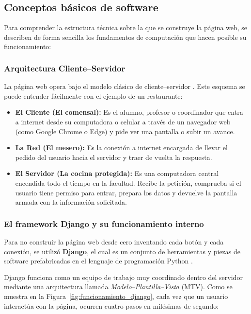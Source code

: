 \subsection{Conceptos básicos de software}
\label{subsec:conceptos_software}

Para comprender la estructura técnica sobre la que se construye la página web, se describen de forma sencilla los fundamentos de computación que hacen posible su funcionamiento:

\subsubsection{Arquitectura Cliente--Servidor}
La página web opera bajo el modelo clásico de cliente--servidor \parencite{tanenbaum2011redes}. Este esquema se puede entender fácilmente con el ejemplo de un restaurante:
\begin{itemize}
    \item \textbf{El Cliente (El comensal):} Es el alumno, profesor o coordinador que entra a internet desde su computadora o celular a través de un navegador web (como Google Chrome o Edge) y pide ver una pantalla o subir un avance.
    \item \textbf{La Red (El mesero):} Es la conexión a internet encargada de llevar el pedido del usuario hacia el servidor y traer de vuelta la respuesta.
    \item \textbf{El Servidor (La cocina protegida):} Es una computadora central encendida todo el tiempo en la facultad. Recibe la petición, comprueba si el usuario tiene permiso para entrar, prepara los datos y devuelve la pantalla armada con la información solicitada.
\end{itemize}

\subsubsection{El framework Django y su funcionamiento interno}
Para no construir la página web desde cero inventando cada botón y cada conexión, se utilizó \textbf{Django}, el cual es un conjunto de herramientas y piezas de software prefabricadas en el lenguaje de programación Python \parencite{rubio2017}. 

Django funciona como un equipo de trabajo muy coordinado dentro del servidor mediante una arquitectura llamada \textit{Modelo--Plantilla--Vista} (MTV). Como se muestra en la Figura~\ref{fig:funcionamiento_django}, cada vez que un usuario interactúa con la página, ocurren cuatro pasos en milésimas de segundo:

